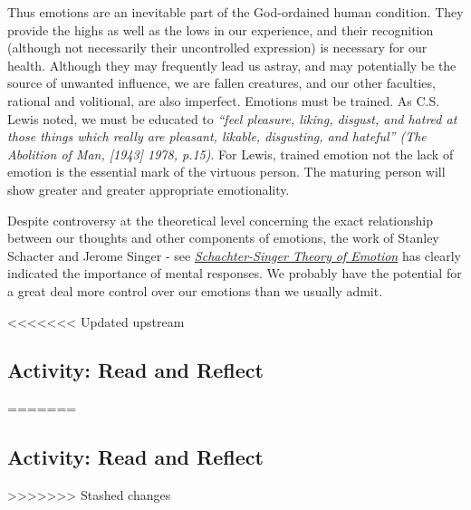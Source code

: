 \documentclass[
]{book}
\begin{document}
Thus emotions are an inevitable part of the God-ordained human condition. They provide the highs as well as the lows in our experience, and their recognition (although not necessarily their uncontrolled expression) is necessary for our health. Although they may frequently lead us astray, and may potentially be the source of unwanted influence, we are fallen creatures, and our other faculties, rational and volitional, are also imperfect. Emotions must be trained. As C.S. Lewis noted, we must be educated to \emph{``feel pleasure, liking, disgust, and hatred at those things which really are pleasant, likable, disgusting, and hateful'' (The Abolition of Man, {[}1943{]} 1978, p.15)}. For Lewis, trained emotion not the lack of emotion is the essential mark of the virtuous person. The maturing person will show greater and greater appropriate emotionality.

Despite controversy at the theoretical level concerning the exact relationship between our thoughts and other components of emotions, the work of Stanley Schacter and Jerome Singer - see \href{https://www.thoughtco.com/schachter-singer-theory-4691140}{\emph{Schachter-Singer Theory of Emotion}} has clearly indicated the importance of mental responses. We probably have the potential for a great deal more control over our emotions than we usually admit.

<<<<<<< Updated upstream
\hypertarget{activity-read-and-reflect-13}{%
\subsection*{Activity: Read and Reflect}\label{activity-read-and-reflect-13}}
=======
\hypertarget{activity-read-and-reflect-12}{%
\subsection*{Activity: Read and Reflect}\label{activity-read-and-reflect-12}}
>>>>>>> Stashed changes
\end{document}
